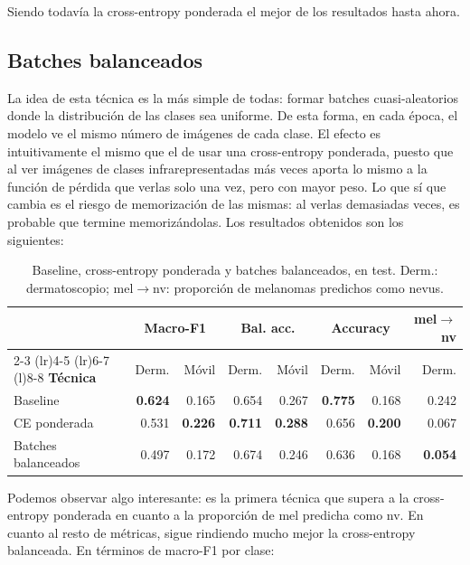 \documentclass[10pt,a4paper]{article}
\renewcommand{\_}{\guionbajo\allowbreak}
\begin{document}
\noindent Siendo todavía la cross-entropy ponderada el mejor de los resultados hasta ahora. 

\subsection{Batches balanceados}
\label{subsec:balanceados}

\noindent La idea de esta técnica es la más simple de todas: formar batches cuasi-aleatorios donde la distribución de las clases 
sea uniforme. De esta forma, en cada época, el modelo ve el mismo número de imágenes de cada clase. El efecto es intuitivamente 
el mismo que el de usar una cross-entropy ponderada, puesto que al ver imágenes de clases infrarepresentadas más veces aporta 
lo mismo a la función de pérdida que verlas solo una vez, pero con mayor peso. Lo que sí que cambia es el riesgo de memorización
de las mismas: al verlas demasiadas veces, es probable que termine memorizándolas. Los resultados obtenidos son los siguientes:

\begin{table}[H]
    \centering
    \small
    \renewcommand{\arraystretch}{1.2}
    \begin{tabular}{@{}lrrrrrrr@{}}
        \toprule
        & \multicolumn{2}{c}{\textbf{Macro-F1}} & \multicolumn{2}{c}{\textbf{Bal. acc.}} & \multicolumn{2}{c}{\textbf{Accuracy}} & \textbf{mel$\to$nv} \\
        \cmidrule(lr){2-3} \cmidrule(lr){4-5} \cmidrule(lr){6-7} \cmidrule(l){8-8}
        \textbf{Técnica} & Derm. & Móvil & Derm. & Móvil & Derm. & Móvil & Derm. \\
        \midrule
        Baseline            & \textbf{0.624} & 0.165 & 0.654 & 0.267 & \textbf{0.775} & 0.168 & 0.242 \\
        CE ponderada        & 0.531 & \textbf{0.226} & \textbf{0.711} & \textbf{0.288} & 0.656 & \textbf{0.200} & 0.067 \\
        Batches balanceados & 0.497 & 0.172 & 0.674 & 0.246 & 0.636 & 0.168 & \textbf{0.054} \\
        \bottomrule
    \end{tabular}
    \caption{Baseline, cross-entropy ponderada y batches balanceados, en test. Derm.: dermatoscopio; mel$\to$nv: proporción de melanomas predichos como nevus.}
    \label{tab:u3-batches}
\end{table}

\noindent Podemos observar algo interesante: es la primera técnica que supera a la cross-entropy ponderada en cuanto a la
proporción de mel predicha como nv. En cuanto al resto de métricas, sigue rindiendo mucho mejor la cross-entropy balanceada. En 
términos de macro-F1 por clase:
\end{document}
